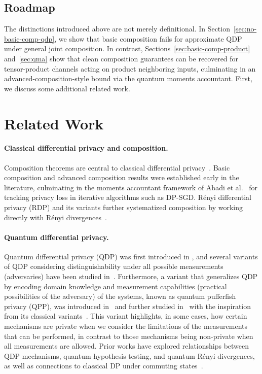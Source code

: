 \documentclass[11pt]{article}
\theoremstyle{plain}
\theoremstyle{remark}
\begin{document}
\subsection{Roadmap}

The distinctions introduced above are not merely definitional.
In Section~\ref{sec:no-basic-comp-qdp}, we show that basic composition fails for approximate QDP under general joint composition.
In contrast, Sections~\ref{sec:basic-comp-product} and~\ref{sec:qma} show that clean composition guarantees can be recovered for tensor-product channels acting on product neighboring inputs, culminating in an advanced-composition-style bound via the quantum moments accountant.
First, we discuss some additional related work.



\section{Related Work}

\paragraph{Classical differential privacy and composition.}
Composition theorems are central to classical differential privacy~\citep{KairouzOhVi17}.
Basic composition and advanced composition results were established early in the literature, culminating in the moments accountant framework of Abadi et al.~\citep{AbadiChGoMcMiTaZh16} for tracking privacy loss in iterative algorithms such as DP-SGD.
R\'enyi differential privacy (RDP) and its variants further systematized composition by working directly with R\'enyi divergences~\citep{mironov2017renyi}.

\paragraph{Quantum differential privacy.} Quantum differential privacy (QDP) was first introduced in \citep{QDP_computation17}, and several variants of QDP considering distinguishability under all possible measurements (adversaries) have been studied in~\citep{AaronsonR19,hirche2022quantum,angrisani2023unifying,NuradhaGW24, angrisani_localModel25,guan2024optimal,gallage2025theory}. Furthermore, a variant that generalizes QDP by encoding domain knowledge and measurement capabilities (practical possibilities of the adversary) of the systems, known as quantum pufferfish privacy (QPP), was introduced in~\citep{NuradhaGW24} and further studied in~\citep{nuradha2025MeasuredHS} with the inspiration from its classical variants~\citep{KM14, nuradha2022pufferfishJ}. This variant highlights, in some cases, how certain mechanisms are private when we consider the limitations of the measurements that can be performed, in contrast to those mechanisms being non-private when all measurements are allowed.
Prior works have explored relationships between QDP mechanisms, quantum hypothesis testing, and quantum R\'enyi divergences, as well as connections to classical DP under commuting states~\citep{hirche2022quantum,NuradhaGW24,Farhad_QP_HT,angrisani_localModel25,nuradha2024contraction,Christoph2024sample,dasgupta2025quantum}. 
\end{document}
